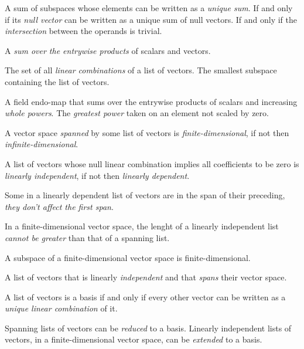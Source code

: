 \begin{multicols}{3}
  A sum of subspaces whose elements can be written as a \textit{unique sum}.
  If and only if its \textit{null vector} can be written as a unique sum of null vectors.
  If and only if the \textit{intersection} between the operands is trivial.

  A \textit{sum over the entrywise products} of scalars and vectors.
  
  The set of all \textit{linear combinations} of a list of vectors.
  The smallest subspace containing the list of vectors.

  A field endo-map that sums over the entrywise products of scalars and increasing \textit{whole powers}.
  The \textit{greatest power} taken on an element not scaled by zero.
  
  A vector space \textit{spanned} by some list of vectors is \textit{finite-dimensional}, if not then \textit{infinite-dimensional}.
  
  A list of vectors whose null linear combination implies all coefficients to be zero is \textit{linearly independent},
  if not then \textit{linearly dependent}.

  Some in a linearly dependent list of vectors are in the span of their preceding, \textit{they don't affect the first span}.
  
  In a finite-dimensional vector space, the lenght of a linearly independent list \textit{cannot be greater} than that of a spanning list.
  
  A subspace of a finite-dimensional vector space is finite-dimensional.
  
  A list of vectors that is linearly \textit{independent} and that \textit{spans} their vector space.
  
  A list of vectors is a basis if and only if every other vector can be written as a \textit{unique linear combination} of it.
  
  Spanning lists of vectors can be \textit{reduced} to a basis. Linearly independent lists of vectors, in a finite-dimensional
  vector space, can be \textit{extended} to a basis.


\end{multicols}
